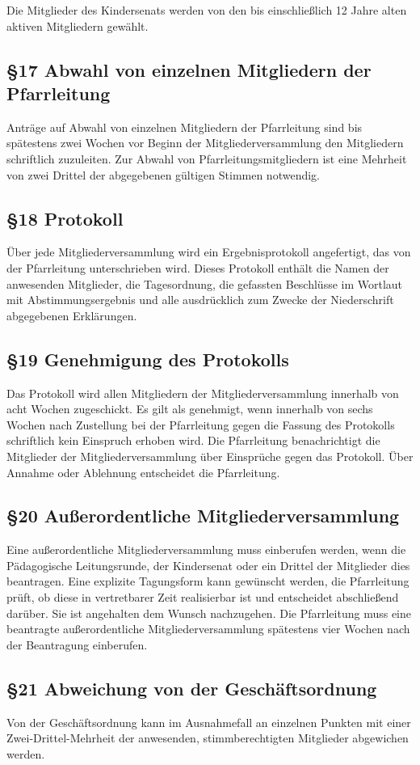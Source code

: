 \documentclass[12pt]{report}
\begin{document}
\begin{justify}
Die Mitglieder des Kindersenats werden von den bis einschließlich 12 Jahre alten aktiven Mitgliedern gewählt.
\subsection*{§17 Abwahl von einzelnen Mitgliedern der Pfarrleitung}
Anträge auf Abwahl von einzelnen Mitgliedern der Pfarrleitung sind bis spätestens zwei Wochen vor Beginn
der Mitgliederversammlung den Mitgliedern schriftlich zuzuleiten. Zur Abwahl von Pfarrleitungsmitgliedern
ist eine Mehrheit von zwei Drittel der abgegebenen gültigen Stimmen notwendig.
\subsection*{§18 Protokoll}
Über jede Mitgliederversammlung wird ein Ergebnisprotokoll angefertigt, das von der Pfarrleitung
unterschrieben wird. Dieses Protokoll enthält die Namen der anwesenden Mitglieder, die Tagesordnung, die
gefassten Beschlüsse im Wortlaut mit Abstimmungsergebnis und alle ausdrücklich zum Zwecke der Niederschrift
abgegebenen Erklärungen.
\subsection*{§19 Genehmigung des Protokolls}
Das Protokoll wird allen Mitgliedern der Mitgliederversammlung innerhalb von acht Wochen zugeschickt. Es
gilt als genehmigt, wenn innerhalb von sechs Wochen nach Zustellung bei der Pfarrleitung gegen die Fassung
des Protokolls schriftlich kein Einspruch erhoben wird. Die Pfarrleitung benachrichtigt die Mitglieder der
Mitgliederversammlung über Einsprüche gegen das Protokoll. Über Annahme oder Ablehnung entscheidet
die Pfarrleitung.
\subsection*{§20 Außerordentliche Mitgliederversammlung}
Eine außerordentliche Mitgliederversammlung muss einberufen werden, wenn die Pädagogische Leitungsrunde, der Kindersenat oder ein Drittel der Mitglieder dies beantragen. Eine explizite Tagungsform kann gewünscht werden, die Pfarrleitung prüft, ob diese in vertretbarer Zeit realisierbar ist und entscheidet abschließend darüber. Sie ist angehalten dem Wunsch nachzugehen. Die Pfarrleitung muss eine beantragte außerordentliche Mitgliederversammlung spätestens vier Wochen nach der Beantragung einberufen.
\subsection*{§21 Abweichung von der Geschäftsordnung}
Von der Geschäftsordnung kann im Ausnahmefall an einzelnen Punkten mit einer Zwei-Drittel-Mehrheit der
anwesenden, stimmberechtigten Mitglieder abgewichen werden.

\end{justify}
\end{document}
